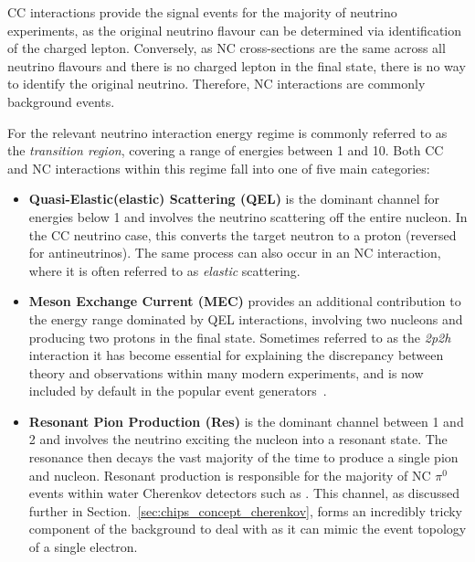 CC interactions provide the signal events for the majority of neutrino experiments, as the
original neutrino flavour can be determined via identification of the charged lepton. Conversely,
as NC cross-sections are the same across all neutrino flavours and there is no charged lepton in
the final state, there is no way to identify the original neutrino. Therefore, NC interactions are
commonly background events.

For \chips the relevant neutrino interaction energy regime is commonly referred to as the
\emph{transition region}, covering a range of energies between 1 and \unit{10}{\GeV}. Both CC and
NC interactions within this regime fall into one of five main categories:

\begin{itemize}
    \item \textbf{Quasi-Elastic(elastic) Scattering (QEL)} is the dominant channel for energies
          below \unit{1}{\GeV} and involves the neutrino scattering off the entire nucleon. In the
          CC neutrino case, this converts the target neutron to a proton (reversed for
          antineutrinos). The same process can also occur in an NC interaction, where it is often
          referred to as \emph{elastic} scattering.

    \item \textbf{Meson Exchange Current (MEC)} provides an additional contribution to the energy
          range dominated by QEL interactions, involving two nucleons and producing two protons in
          the final state. Sometimes referred to as the \emph{2p2h} interaction it has become
          essential for explaining the discrepancy between theory and observations within many
          modern experiments, and is now included by default in the popular event
          generators~\cite{katori2013}.

    \item \textbf{Resonant Pion Production (Res)} is the dominant channel between 1 and
          \unit{2}{\GeV} and involves the neutrino exciting the nucleon into a resonant state. The
          resonance then decays the vast majority of the time to produce a single pion and
          nucleon. Resonant production is responsible for the majority of NC $\pi^{0}$ events
          within water Cherenkov detectors such as \chips. This channel, as discussed further in
          Section.~\ref{sec:chips_concept_cherenkov}, forms an incredibly tricky component of the
          background to deal with as it can mimic the event topology of a single electron.


\end{itemize}
